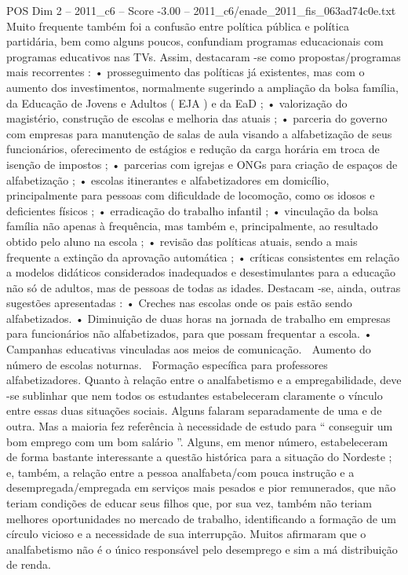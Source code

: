 \begin{textsample}{POS Dim 2 – 2011\_c6 – Score -3.00 – 2011\_c6/enade\_2011\_fis\_063ad74c0e.txt}
Muito frequente também foi a confusão entre política pública e política partidária, bem como alguns poucos, confundiam programas educacionais com programas educativos nas TVs.
Assim, destacaram -se como propostas/programas mais recorrentes : • prosseguimento das políticas já existentes, mas com o aumento dos investimentos, normalmente sugerindo a ampliação da bolsa família, da Educação de Jovens e Adultos ( EJA ) e da EaD ; • valorização do magistério, construção de escolas e melhoria das atuais ; • parceria do governo com empresas para manutenção de salas de aula visando a alfabetização de seus funcionários, oferecimento de estágios e redução da carga horária em troca de isenção de impostos ; • parcerias com igrejas e ONGs para criação de espaços de alfabetização ; • escolas itinerantes e alfabetizadores em domicílio, principalmente para pessoas com dificuldade de locomoção, como os idosos e deficientes físicos ; • erradicação do trabalho infantil ; • vinculação da bolsa família não apenas à frequência, mas também e, principalmente, ao resultado obtido pelo aluno na escola ; • revisão das políticas atuais, sendo a mais frequente a extinção da aprovação automática ; • críticas consistentes em relação a modelos didáticos considerados inadequados e desestimulantes para a educação não só de adultos, mas de pessoas de todas as idades.
Destacam -se, ainda, outras sugestões apresentadas : • Creches nas escolas onde os pais estão sendo alfabetizados. • Diminuição de duas horas na jornada de trabalho em empresas para funcionários não alfabetizados, para que possam frequentar a escola. • Campanhas educativas vinculadas aos meios de comunicação.  Aumento do número de escolas noturnas.  Formação específica para professores alfabetizadores.
Quanto à relação entre o analfabetismo e a empregabilidade, deve -se sublinhar que nem todos os estudantes estabeleceram claramente o vínculo entre essas duas situações sociais.
Alguns falaram separadamente de uma e de outra.
Mas a maioria fez referência à necessidade de estudo para “ conseguir um bom emprego com um bom salário ”.
Alguns, em menor número, estabeleceram de forma bastante interessante a questão histórica para a situação do Nordeste ; e, também, a relação entre a pessoa analfabeta/com pouca instrução e a desempregada/empregada em serviços mais pesados e pior remunerados, que não teriam condições de educar seus filhos que, por sua vez, também não teriam melhores oportunidades no mercado de trabalho, identificando a formação de um círculo vicioso e a necessidade de sua interrupção.
Muitos afirmaram que o analfabetismo não é o único responsável pelo desemprego e sim a má distribuição de renda.

\end{textsample}
